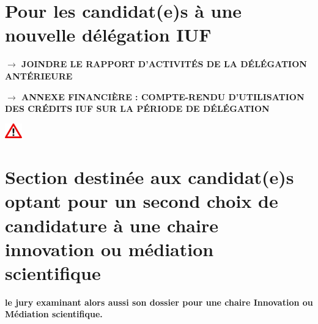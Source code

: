 \documentclass[a4paper,11pt]{article}
\newcommand{\anglaisFrancais}[2]{#2}
\newcommand{\anglaisFrancais}[2]{#1}
\begin{document}
\section{\anglaisFrancais{For candidates for a new IUF delegation}{Pour les candidat(e)s à une nouvelle délégation IUF}}

\noindent{}\textbf{$\rightarrow$ \MakeUppercase{\anglaisFrancais{Join the activity report of the previous delegation}{Joindre le rapport d'activités de la délégation antérieure}}}


\bigskip

\noindent{}\textbf{$\rightarrow$ \MakeUppercase{\anglaisFrancais{Financial annex: summary of the use of IUF funds over the delegation period}{Annexe financière : compte-rendu d'utilisation des crédits IUF sur la période de délégation}}}

\begin{center}
	\includegraphics[width=2em]{warning}
\end{center}



\section{\anglaisFrancais{Section for candidates opting for a second choice of chair in innovation or scientific mediation}{Section destinée aux candidat(e)s optant pour un second choix de candidature à une chaire innovation ou médiation scientifique}}

\textbf{\anglaisFrancais{The jury will therefore also consider the application for a Chair in Innovation or Scientific Mediation.}{le jury examinant alors aussi son dossier pour une chaire Innovation ou Médiation scientifique.}}
\end{document}
